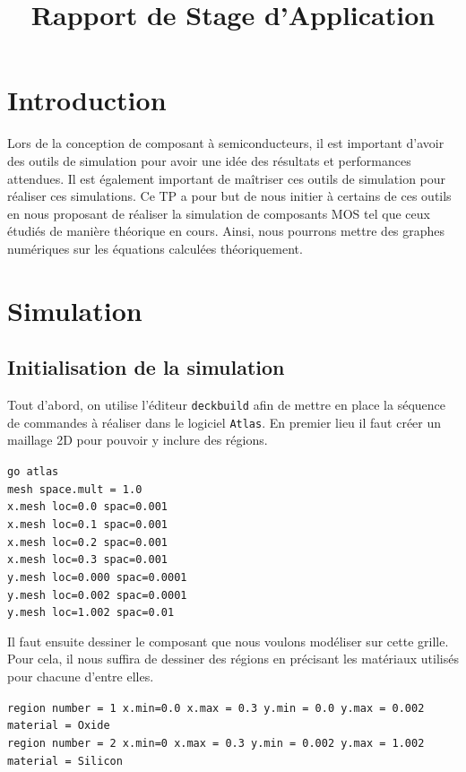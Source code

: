 \documentclass[a4paper,11pt]{report}
\title{Rapport de Stage d'Application}
\begin{document}


\chapter{Introduction}
Lors de la conception de composant à semiconducteurs, il est important d'avoir des outils de simulation pour avoir une idée des résultats et performances attendues. Il est également important de maîtriser ces outils de simulation pour réaliser ces simulations. Ce TP a pour but de nous initier à certains de ces outils en nous proposant de réaliser la simulation de composants MOS tel que ceux étudiés de manière théorique en cours. Ainsi, nous pourrons mettre des graphes  numériques sur les équations calculées théoriquement.

\chapter{Simulation}

\section{Initialisation de la simulation}

Tout d'abord, on utilise l'éditeur \texttt{deckbuild} afin de mettre en place la séquence de commandes à réaliser dans le logiciel \texttt{Atlas}. En premier lieu il faut créer un maillage 2D pour pouvoir y inclure des régions.


\noindent\texttt{go atlas\\mesh space.mult = 1.0\\x.mesh loc=0.0 spac=0.001\\x.mesh loc=0.1 spac=0.001\\x.mesh loc=0.2 spac=0.001\\x.mesh loc=0.3 spac=0.001\\y.mesh loc=0.000 spac=0.0001\\y.mesh loc=0.002 spac=0.0001\\y.mesh loc=1.002 spac=0.01\\}


Il faut ensuite dessiner le composant que nous voulons modéliser sur cette grille. Pour cela, il nous suffira de dessiner des régions en précisant les matériaux utilisés pour chacune d'entre elles.
\vspace{0.3cm}

\noindent\texttt{region number = 1 x.min=0.0 x.max = 0.3 y.min = 0.0 y.max = 0.002 material = Oxide\\
region number = 2 x.min=0 x.max = 0.3 y.min = 0.002 y.max = 1.002 material = Silicon}
\vspace{0.3cm}
\end{document}

